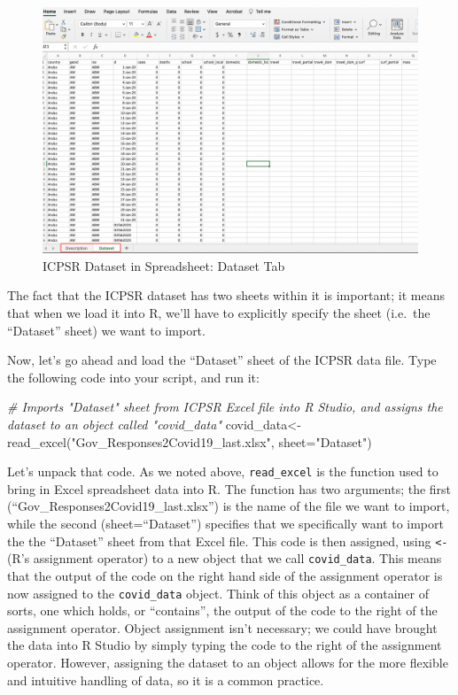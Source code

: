 \documentclass[
]{article}
\newenvironment{Shaded}{\begin{snugshade}}{\end{snugshade}}
\newcommand{\AttributeTok}[1]{\textcolor[rgb]{0.77,0.63,0.00}{#1}}
\newcommand{\CommentTok}[1]{\textcolor[rgb]{0.56,0.35,0.01}{\textit{#1}}}
\newcommand{\FunctionTok}[1]{\textcolor[rgb]{0.00,0.00,0.00}{#1}}
\newcommand{\NormalTok}[1]{#1}
\newcommand{\OtherTok}[1]{\textcolor[rgb]{0.56,0.35,0.01}{#1}}
\newcommand{\StringTok}[1]{\textcolor[rgb]{0.31,0.60,0.02}{#1}}
\begin{document}
\begin{figure}
\includegraphics[width=1\linewidth]{images/excel_tabs} \caption{ICPSR Dataset in Spreadsheet: Dataset Tab}\label{fig:unnamed-chunk-11}
\end{figure}

The fact that the ICPSR dataset has two sheets within it is important; it means that when we load it into R, we'll have to explicitly specify the sheet (i.e.~the ``Dataset'' sheet) we want to import.

Now, let's go ahead and load the ``Dataset'' sheet of the ICPSR data file. Type the following code into your script, and run it:

\begin{Shaded}
\begin{Highlighting}[]
\CommentTok{\# Imports "Dataset" sheet from ICPSR Excel file into R Studio, and assigns the dataset to an object called "covid\_data"}
\NormalTok{covid\_data}\OtherTok{\textless{}{-}}\FunctionTok{read\_excel}\NormalTok{(}\StringTok{"Gov\_Responses2Covid19\_last.xlsx"}\NormalTok{, }\AttributeTok{sheet=}\StringTok{"Dataset"}\NormalTok{)}
\end{Highlighting}
\end{Shaded}

Let's unpack that code. As we noted above, \texttt{read\_excel} is the function used to bring in Excel spreadsheet data into R. The function has two arguments; the first (``Gov\_Responses2Covid19\_last.xlsx'') is the name of the file we want to import, while the second (sheet=``Dataset'') specifies that we specifically want to import the the ``Dataset'' sheet from that Excel file. This code is then assigned, using \texttt{\textless{}-} (R's assignment operator) to a new object that we call \texttt{covid\_data}. This means that the output of the code on the right hand side of the assignment operator is now assigned to the \texttt{covid\_data} object. Think of this object as a container of sorts, one which holds, or ``contains'', the output of the code to the right of the assignment operator. Object assignment isn't necessary; we could have brought the data into R Studio by simply typing the code to the right of the assignment operator. However, assigning the dataset to an object allows for the more flexible and intuitive handling of data, so it is a common practice.
\end{document}
